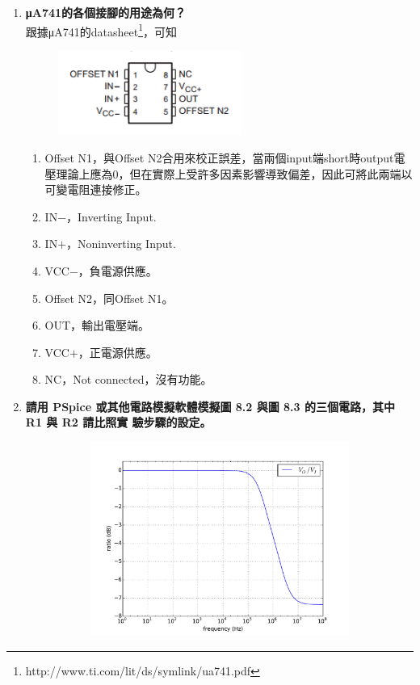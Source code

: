 \documentclass[12pt, a4paper]{article}
\def\large{\fontsize{14}{21}\selectfont}
\begin{document}
\begin{enumerate}[itemsep=20pt, topsep=10pt]
  \item {\large\bf μA741的各個接腳的用途為何？} \\[10pt]
    跟據μA741的datasheet\footnote{http://www.ti.com/lit/ds/symlink/ua741.pdf}，可知
    \begin{figure}[H]
      \centering
      \includegraphics[width=6cm]{img/p1.png}
    \end{figure}
    \begin{enumerate}[label=pin \arabic*:, labelindent=0cm, leftmargin=*]
      \item Offset N1，與Offset N2合用來校正誤差，當兩個input端short時output電壓理論上應為0，但在實際上受許多因素影響導致偏差，因此可將此兩端以可變電阻連接修正。
      \item IN$-$，Inverting Input.
      \item IN$+$，Noninverting Input.
      \item VCC$-$，負電源供應。
      \item Offset N2，同Offset N1。
      \item OUT，輸出電壓端。
      \item VCC$+$，正電源供應。
      \item NC，Not connected，沒有功能。
    \end{enumerate}
    \clearpage
  \item {\large\bf 請用 PSpice 或其他電路模擬軟體模擬圖 8.2 與圖 8.3 的三個電路，其中 R1 與 R2 請比照實
驗步驟的設定。} 
  \begin{figure}[H]
    \centering
    \begin{subfigure}[b]{0.45\textwidth}
      \includegraphics[width=1\textwidth]{circuit/p1.pdf}

\end{subfigure}
\end{figure}
\end{enumerate}
\end{document}
